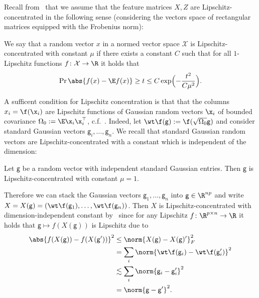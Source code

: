 Recall from~ that we assume that the feature matrices $X,Z$ are Lipschitz-concentrated in the following sense (considering the vectors space of rectangular matrices equipped with the Frobenius norm): 
\begin{definition}
    We say that a random vector $x$ in a normed vector space $\mathcal X$ is Lipschitz-concentrated with constant $\mu$ if there exists a constant $C$ such that for all $1$-Lipschitz functions $f\colon \mathcal X\to\R$ it holds that
    \begin{equation}
        \Pr{\abs{f(x)-\E f(x)}\ge t} \le C\exp\Bigl(-\frac{t^2}{C\mu^2}\Bigr).
    \end{equation}
\end{definition}
A sufficent condition for Lipschitz concentration is that that the columns $x_i=\f(\x_i)$ are Lipschitz functions of Gaussian random vectors $\x_i$ of bounded covariance $\Omega_0:=\E \x_i\x_i^\top$, c.f.~. Indeed, let $\wt\f(\mathsf{g}):=\f(\sqrt{\Omega_0}\mathsf{g})$ and consider standard Gaussian vectors $\mathsf g_i,\ldots, \mathsf g_n$. We recall that standard Gaussian random vectors are Lipschitz-concentrated with a constant which is independent of the dimension:
\begin{theorem}\label{thm:gaussian_concentration}
    Let $\mathsf g$ be a random vector with independent standard Gaussian entries. Then $\mathsf g$ is Lipschitz-concentrated with constant $\mu=1$.
\end{theorem}
Therefore we can stack the Gaussian vectors $\mathsf{g}_1,\ldots,\mathsf{g}_n$ into $\mathsf g\in\R^{np}$ and write $X=X(\mathsf g)=(\wt\f(\mathsf g_1), \ldots, \wt\f(\mathsf g_n))$. Then $X$ is Lipschitz-concentrated with dimension-independent constant by~  since for any Lipschitz $f\colon\R^{p\times n}\to\R$ it holds that $\mathsf g\mapsto f(X(\mathsf g))$ is Lipschitz due to 
\begin{equation}
    \begin{aligned}
    \abs{f(X(\mathsf g))-f(X(\mathsf g'))}^2 &\le \norm{X(\mathsf g)-X(\mathsf g)'}_F^2 \\
    &= \sum_i\norm{\wt\f(\mathsf g_i)-\wt\f(\mathsf g_i') }^2 \\
    &\lesssim \sum_i \norm{\mathsf g_i-\mathsf g_i'}^2\\
    &=\norm{\mathsf g-\mathsf g'}^2.
    \end{aligned}
\end{equation}

